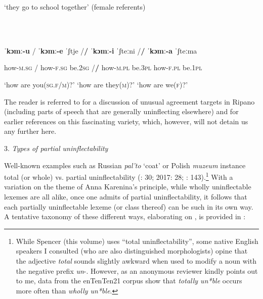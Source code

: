 \documentclass[output=paper]{langscibook}
\begin{document}
\begin{styleTabellaLUNGA}
    ‘they go to school together’ (female referents)
\end{styleTabellaLUNGA}

\begin{styleTabellaLUNGA}
\ea%
    \label{ex:key:2}
    \gll \\
         \\
    \glt
    \z %

          \textbf{ˈkɔmː-u}    /   \textbf{ˈkɔmː-e}    ˈʃtje   /\textbf{/}  \textbf{ˈkɔmː-i}   ˈʃteːni  /\textbf{/}  \textbf{ˈkɔmː-a}   ˈʃteːma
\end{styleTabellaLUNGA}

\begin{styleTabellaLUNGA}
  how-\textsc{m.sg}   \textsc{/}  how-\textsc{f.sg}   be.\textsc{2sg}  /\textbf{/}  how-\textsc{m.pl}  be.\textsc{3pl}   how-\textsc{f.pl}  be.\textsc{1pl}
\end{styleTabellaLUNGA}

\begin{styleTabellaLUNGA}
  ‘how are you(\textsc{sg.f/m})?’        ‘how are they(\textsc{m})?’  ‘how are we(\textsc{f})?’
\end{styleTabellaLUNGA}

The reader is referred to \citet{Paciaroni2023} for a discussion of unusual agreement targets in Ripano (including parts of speech that are generally uninflecting elsewhere) and for earlier references on this fascinating variety, which, however, will not detain us any further here.

\begin{styleBiblio}
3. \textit{Types of partial uninflectability}
\end{styleBiblio}

Well-known examples such as Russian \textit{pal’to} ‘coat’ or Polish \textit{muzeum} instance total (or whole) vs. partial uninflectability (\citealt{BaermanEtAl2005}: 30; 2017: 28; \citealt{Spencer2020}: 143).\footnote{While Spencer (this volume) uses “total uninflectability”, some native English speakers I consulted (who are also distinguished morphologists) opine that the adjective \textit{total} sounds slightly awkward when used to modify a noun with the negative prefix \textit{un}{}-. However, as an anonymous reviewer kindly points out to me, data from the enTenTen21 corpus show that \textit{totally un*ble} occurs more often than \textit{wholly un*ble}.} With a variation on the theme of Anna Karenina’s principle, while wholly uninflectable lexemes are all alike, once one admits of partial uninflectability, it follows that each partially uninflectable lexeme (or class thereof) can be such in its own way. A tentative taxonomy of these different ways, elaborating on \citet{Spencer2020}, is provided in : 
\end{document}
